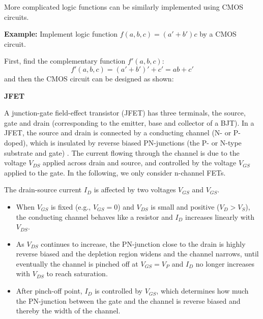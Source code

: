 More complicated logic functions can be similarly implemented using CMOS
circuits.

{\bf Example:} Implement logic function $f(a,b,c)=(a'+b')c$ by a CMOS circuit.

First, find the complementary function $f'(a,b,c)$:
\[ f'(a,b,c)=(a'+b')'+c'=ab+c' \]
and then the CMOS circuit can be designed as shown:








	

	












\item {\bf JFET}

A junction-gate field-effect transistor (JFET) has three terminals, the 
source, gate and drain (corresponding to the emitter, base and collector 
of a BJT). In a JFET, the source and drain is connected by a conducting 
channel (N- or P-doped), which is insulated by reverse biased PN-junctions 
(the P- or N-type substrate and gate) . The current flowing through the
channel is due to the voltage $V_{DS}$ applied across drain and source, 
and controlled by the voltage $V_{GS}$ applied to the gate. In the following,
we only consider n-channel FETs.


The drain-source current $I_D$ is affected by two voltages $V_{GS}$
and $V_{GS}$. 
\begin{itemize}
\item When $V_{GS}$ is fixed (e.g., $V_{GS}=0$) and $V_{DS}$ is small
	and positive ($V_D>V_S$), the conducting channel behaves like a
	resistor and $I_D$ increases linearly with $V_{DS}$.
\item As $V_{DS}$ continues to increase, the PN-junction close to the 
	drain is highly reverse biased and the depletion region widens
	and the channel narrows, until eventually the channel is pinched 
	off at $V_{GS}=V_P$ and $I_D$ no longer increases with $V_{DS}$ 
	to reach saturation.
\item After pinch-off point, $I_D$ is controlled by $V_{GS}$, which
	determines how much the PN-junction between the gate and the 
	channel is reverse biased and thereby the width of the channel.
\end{itemize}

